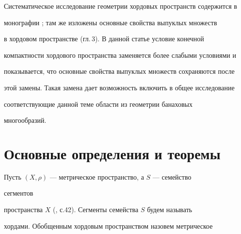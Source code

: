 \date{} 




 


\pagestyle{plain} %


 


 




 


\maketitle 


\label{begin} 


 


Систематическое исследование геометрии хордовых пространств содержится в 


монографии \cite{1}; там же изложены основные свойства выпуклых множеств 


в хордовом пространстве (гл.\,3). В данной статье условие конечной 


компактности хордового пространства заменяется более слабыми условиями и 


показывается, что основные свойства выпуклых множеств сохраняются после 


этой замены. Такая замена дает возможность включить в общее исследование 


соответствующие данной теме области из геометрии банаховых 


многообразий. 


 


\section{Основные определения и теоремы} 


 


Пусть $(X,\rho)$ --- метрическое пространство, а $S$ --- семейство 


сегментов 


пространства $X$ (\cite{2}, с.42). Сегменты семейства $S$ будем называть 


хордами. Обобщенным хордовым пространством назовем метрическое 


